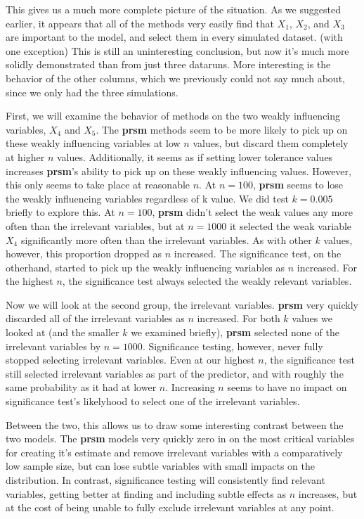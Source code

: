 \documentclass[letter]{article}
\begin{document}
This gives us a much more complete picture of the situation. As we suggested earlier, it appears that all of the methods very easily find that $X_1$, $X_2$, and $X_3$ are important to the model, and select them in every simulated dataset. (with one exception) This is still an uninteresting conclusion, but now it's much more solidly demonstrated than from just three dataruns. More interesting is the behavior of the other columns, which we previously could not say much about, since we only had the three simulations.

First, we will examine the behavior of methods on the two weakly influencing variables, $X_4$ and $X_5$. The \textbf{prsm} methods seem to be more likely to pick up on these weakly influencing variables at low $n$ values, but discard them completely at higher $n$ values. Additionally, it seems as if setting lower tolerance values increases \textbf{prsm}'s ability to pick up on these weakly influencing values. However, this only seems to take place at reasonable $n$. At $n=100$, \textbf{prsm} seems to lose the weakly influencing variables regardless of k value. We did test $k=0.005$ briefly to explore this. At $n=100$, \textbf{prsm} didn't select the weak values any more often than the irrelevant variables, but at $n=1000$ it selected the weak variable $X_4$ significantly more often than the irrelevant variables. As with other $k$ values, however, this proportion dropped as $n$ increased. The significance test, on the otherhand, started to pick up the weakly influencing variables as $n$ increased. For the highest $n$, the significance test always selected the weakly relevant variables. 

Now we will look at the second group, the irrelevant variables. \textbf{prsm} very quickly discarded all of the irrelevant variables as $n$ increased. For both $k$ values we looked at (and the smaller $k$ we examined briefly), \textbf{prsm} selected none of the irrelevant variables by $n=1000$. Significance testing, however, never fully stopped selecting irrelevant variables. Even at our highest $n$, the significance test still selected irrelevant variables as part of the predictor, and with roughly the same probability as it had at lower $n$. Increasing $n$ seems to have no impact on significance test's likelyhood to select one of the irrelevant variables.

Between the two, this allows us to draw some interesting contrast between the two models. The \textbf{prsm} models very quickly zero in on the most critical variables for creating it's estimate and remove irrelevant variables with a comparatively low sample size, but can lose subtle variables with small impacts on the distribution. In contrast, significance testing will consistently find relevant variables, getting better at finding and including subtle effects as $n$ increases, but at the cost of being unable to fully exclude irrelevant variables at any point.
\end{document}
